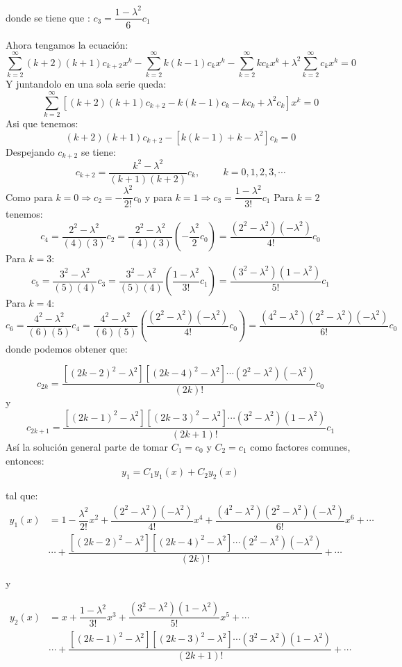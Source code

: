 donde se tiene que : $c_{3} = \dfrac{1 -\lambda^{2}}{6}c_{1}$

Ahora tengamos la ecuación:
$$\sum_{k = 2}^{\infty}(k + 2)(k + 1)c_{k + 2}x^{k} -\sum_{k = 2}^{\infty}k(k -1)c_{k}x^{k} -\sum_{k = 2}^{\infty}kc_{k}x^{k} + \lambda^{2} \sum_{k = 2}^{\infty}c_{k}x^{k} = 0$$
Y juntandolo en una sola serie queda:
$$\sum_{k = 2}^{\infty} \left[ (k + 2)(k + 1)c_{k + 2} -k(k -1)c_{k} -kc_{k} + \lambda^{2}c_{k} \right]x^{k} = 0$$
Asi que tenemos:
$$(k + 2)(k + 1)c_{k + 2} -[k(k -1) + k -\lambda^{2}]c_{k} = 0$$
Despejando $c_{k+2}$ se tiene:
$$c_{k + 2} = \dfrac{k^{2} -\lambda^{2}}{(k + 1)(k + 2)}c_{k}, \hspace{1cm} k = 0, 1, 2, 3, \cdots$$
Como para $k=0 \Rightarrow c_{2} = -\dfrac{\lambda^{2}}{2!}c_{0}$ y para $k=1 \Rightarrow c_{3} = \dfrac{1 -\lambda^{2}}{3!}c_{1}$
Para $k=2$ tenemos:
$$c_{4} = \dfrac{2^{2} -\lambda^{2}}{(4)(3)}c_{2} = \dfrac{2^{2} -\lambda^{2}}{(4)(3)} \left( -\dfrac{\lambda^{2}}{2}c_{0} \right) = \dfrac{(2^{2} -\lambda^{2})(-\lambda^{2})}{4!}c_{0}$$
Para $k=3$:
$$c_{5} = \dfrac{3^{2} -\lambda^{2}}{(5)(4)}c_{3} = \dfrac{3^{2} -\lambda^{2}}{(5)(4)} \left( \dfrac{1 -\lambda^{2}}{3!}c_{1} \right) = \dfrac{(3^{2} -\lambda^{2})(1 -\lambda^{2})}{5!}c_{1}$$
Para $k=4$:
$$c_{6} = \dfrac{4^{2} -\lambda^{2}}{(6)(5)}c_{4} = \dfrac{4^{2} -\lambda^{2}}{(6)(5)} \left( \dfrac{(2^{2} -\lambda^{2})(-\lambda^{2})}{4!}c_{0} \right) = \dfrac{(4^{2} -\lambda^{2})(2^{2} -\lambda^{2})(-\lambda^{2})}{6!}c_{0}$$
donde podemos obtener que:

$$c_{2k} = \dfrac{[(2k -2)^{2} -\lambda^{2}][(2k -4)^{2} -\lambda^{2}] \cdots (2^{2} -\lambda^{2})(-\lambda^{2})}{(2k)!}c_{0}$$
y
$$c_{2k + 1} = \dfrac{[(2k -1)^{2} -\lambda^{2}][(2k -3)^{2}-\lambda^{2}] \cdots (3^{2} -\lambda^{2})(1 -\lambda^{2})}{(2k + 1)!}c_{1}$$
Así la solución general parte de tomar $C_1=c_0$ y $C_2=c_1$ como factores comunes, entonces:
$$y_{1} = C_{1}y_{1}(x) + C_{2}y_{2}(x) \label{9} \tag{9}$$

tal que:
\begin{align*}
y_{1}(x) &= 1 -\dfrac{\lambda^{2}}{2!}x^{2} + \dfrac{(2^{2} -\lambda^{2})(-\lambda^{2})}{4!}x^{4} + \dfrac{(4^{2} -\lambda^{2})(2^{2} -\lambda^{2})(-\lambda^{2})}{6!}x^{6} + \cdots\\
&\cdots + \dfrac{[(2k -2)^{2} -\lambda^{2}][(2k -4)^{2} -\lambda^{2}] \cdots (2^{2} -\lambda^{2})(-\lambda^{2})}{(2k)!} + \cdots \label{10} \tag{10}
\end{align*}

y 

\begin{align*}
y_{2}(x) &= x + \dfrac{1 -\lambda^{2}}{3!}x^{3} + \dfrac{(3^{2} -\lambda^{2})(1 -\lambda^{2})}{5!}x^{5} + \cdots \\
&\cdots + \dfrac{[(2k -1)^{2} -\lambda^{2}][(2k -3)^{2}-\lambda^{2}] \cdots (3^{2} -\lambda^{2})(1 -\lambda^{2})}{(2k + 1)!} + \cdots \label{11} \tag{11}
\end{align*}